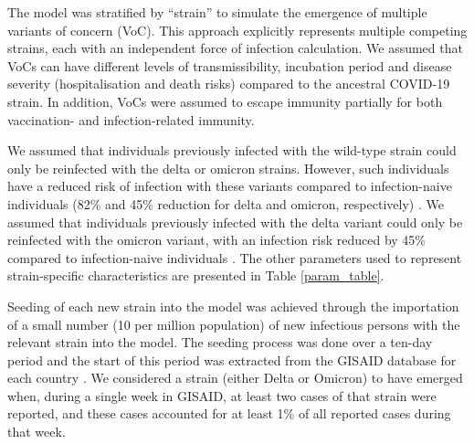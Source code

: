 
The model was stratified by ``strain'' to simulate the emergence of multiple variants of concern (VoC).
This approach explicitly represents multiple competing strains, each with an independent force of infection calculation.
We assumed that VoCs can have different levels of transmissibility, incubation period and disease severity 
(hospitalisation and death risks) compared to the ancestral COVID-19 strain. In addition, VoCs were assumed to escape 
immunity partially for both vaccination- and infection-related immunity. 

We assumed that individuals previously infected with the wild-type strain could only be reinfected with the delta or 
omicron strains. However, such individuals have a reduced risk of infection with these variants compared to 
infection-naive individuals (82\% and 45\% reduction for delta and omicron, respectively) \cite{stein2023}.
We assumed that individuals previously infected with the delta variant could only be reinfected with the omicron variant, 
with an infection risk reduced by 45\% compared to infection-naive individuals \cite{stein2023}. 
The other parameters used to represent strain-specific characteristics are presented in Table \ref{param_table}.

Seeding of each new strain into the model was achieved through the importation of a small number (10 per million population) of new infectious persons with the relevant strain into the model.
The seeding process was done over a ten-day period and the start of this period was extracted from the GISAID database for each country \cite{gisaid2023}. 
We considered a strain (either Delta or Omicron) to have emerged when, during a single week in GISAID, at least two cases of that strain were reported, and these cases accounted for at least 1\% of all reported cases during that week.
